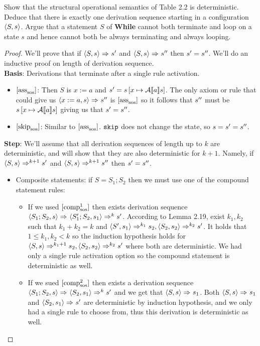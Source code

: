 
Show that the structural operational semantics of Table 2.2 is deterministic. Deduce that there is exactly one derivation sequence starting in a configuration $\state{S}{s}$. Argue that a statement $S$ of \textbf{While} cannot both terminate and loop on a state $s$ and hence cannot both be always terminating and always looping.
\begin{proof}
We'll prove that if $\sosftrans{S}{s}{s^\prime}$ and $\sosftrans{S}{s}{s^\pprime}$ then $s^\prime=s^\pprime$. We'll do an inductive proof on length of derivation sequence.
\\
\textbf{Basis}: Derivations that terminate after a single rule activation.
\begin{itemize}
	\item $\sosrule{ass}$:  Then $S$ is $x:=a$ and $s^\prime=s\mapvar{x}{\aeval{a}{s}}$. The only axiom or rule that could give us $\sosftrans{x:=a}{s}{s^\pprime}$ is $\sosrule{ass}$ so it follows that $s^\pprime$ must be $s\mapvar{x}{\aeval{a}{s}}$ giving us that $s^\prime = s^\pprime$.
	\item $\sosrule{skip}$: Similar to $\sosrule{ass}$. $\sskip$ does not change the state, so $s=s^\prime=s^\pprime$.
\end{itemize}
\textbf{Step}: We'll assume that all derivation sequences of length up to $k$ are deterministic, and will show that they are also deterministic for $k+1$. Namely, if $\sosftrans[k+1]{S}{s}{s^\prime}$ and $\sosftrans[k+1]{S}{s}{s^\pprime}$ then $s^\prime = s^\pprime$.
\begin{itemize}
	\item Composite statements: if $S=S_1;S_2$ then we must use one of the compound statement rules:
	\begin{itemize}
		\item If we used $\sosrule[1]{comp}$ then exists derivation sequence $\sostrans{S_1;S_2}{s}{S_1^\prime;S_2}{s_1}\Rightarrow^{k}s^\prime$. According to Lemma 2.19, exist $k_1,k_2$ such that $k_1 + k_2 = k$ and $\sosftrans[k_1]{S^\prime}{s_1}{s_2}, \sosftrans[k_2]{S_2}{s_2}{s^\prime}$. It holds that $1\le k_1,k_2 < k$ so the induction hypothesis holds for $\sosftrans[k_1+1]{S}{s}{s_2}, \sosftrans[k_2]{S_2}{s_2}{s^\prime}$ where both are deterministic. We had only a single rule activation option so the compound statement is deterministic as well.
		\item If we sued $\sosrule[2]{comp}$ then exists a derivation sequence $\sostrans{S_1;S_2}{s}{S_2}{s_1}\Rightarrow^{k}s^\prime$ and we get that $\sosftrans{S}{s}{s_1}$. Both $\sosftrans{S}{s}{s_1}$ and $\sosftrans{S_2}{s_1}{s^\prime}$ are deterministic by induction hypothesis, and we only had a single rule to choose from, thus this derivation is deterministic as well.

\end{itemize}
\end{itemize}
\end{proof}
